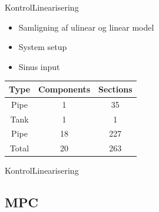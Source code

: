 \begin{frame}{Kontrol}{Linearisering}
   \vfill\vfill\centering
    \begin{minipage}[t]{0.48\linewidth}
\begin{itemize}
		\item Samligning af ulinear og linear model
		\item System setup
	   	\item Sinus input
\end{itemize}    
\end{minipage}\hfill
\begin{minipage}[t]{0.48\linewidth}
\begin{table}[H]
\centering
\begin{tabular}{|c|c|c|}
\hline
	\rowcolor[HTML]{9B9B9B} 
Type  & Components & Sections \\ \hline
Pipe  & 1         & 35       \\ \hline
Tank  & 1         & 1        \\ \hline
Pipe  & 18        & 227      \\ \hline
Total & 20        & 263      \\ \hline
\end{tabular}
\label{tab:system_setup_nonlinear_linear_test}
\end{table}

\end{minipage}
\vfill\vfill

\end{frame}

\begin{frame}{Kontrol}{Linearisering}
    
\begin{figure}[H]
\centering

\label{fig:linear_nonlinear_comparison_last_pipe}
\end{figure}

\end{frame}

\subsection{MPC}

